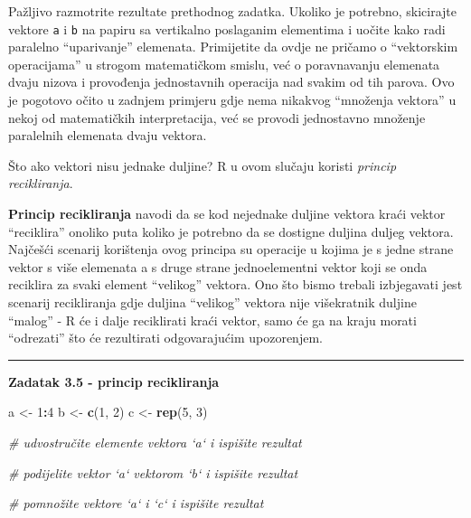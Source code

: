 \documentclass[]{book}
\newenvironment{Shaded}{\begin{snugshade}}{\end{snugshade}}
\newcommand{\KeywordTok}[1]{\textcolor[rgb]{0.13,0.29,0.53}{\textbf{#1}}}
\newcommand{\DecValTok}[1]{\textcolor[rgb]{0.00,0.00,0.81}{#1}}
\newcommand{\StringTok}[1]{\textcolor[rgb]{0.31,0.60,0.02}{#1}}
\newcommand{\CommentTok}[1]{\textcolor[rgb]{0.56,0.35,0.01}{\textit{#1}}}
\newcommand{\OperatorTok}[1]{\textcolor[rgb]{0.81,0.36,0.00}{\textbf{#1}}}
\newcommand{\NormalTok}[1]{#1}
\theoremstyle{definition}
\theoremstyle{definition}
\theoremstyle{definition}
\theoremstyle{remark}
\begin{document}
Pažljivo razmotrite rezultate prethodnog zadatka. Ukoliko je potrebno,
skicirajte vektore \texttt{a} i \texttt{b} na papiru sa vertikalno
poslaganim elementima i uočite kako radi paralelno ``uparivanje''
elemenata. Primijetite da ovdje ne pričamo o ``vektorskim operacijama''
u strogom matematičkom smislu, već o poravnavanju elemenata dvaju nizova
i provođenja jednostavnih operacija nad svakim od tih parova. Ovo je
pogotovo očito u zadnjem primjeru gdje nema nikakvog ``množenja
vektora'' u nekoj od matematičkih interpretacija, već se provodi
jednostavno množenje paralelnih elemenata dvaju vektora.

Što ako vektori nisu jednake duljine? R u ovom slučaju koristi
\emph{princip recikliranja}.

\textbf{Princip recikliranja} navodi da se kod nejednake duljine vektora
kraći vektor ``reciklira'' onoliko puta koliko je potrebno da se
dostigne duljina duljeg vektora. Najčešći scenarij korištenja ovog
principa su operacije u kojima je s jedne strane vektor s više elemenata
a s druge strane jednoelementni vektor koji se onda reciklira za svaki
element ``velikog'' vektora. Ono što bismo trebali izbjegavati jest
scenarij recikliranja gdje duljina ``velikog'' vektora nije višekratnik
duljine ``malog'' - R će i dalje reciklirati kraći vektor, samo će ga na
kraju morati ``odrezati'' što će rezultirati odgovarajućim upozorenjem.

\begin{center}\rule{0.5\linewidth}{\linethickness}\end{center}

\textbf{Zadatak 3.5 - princip recikliranja}

\begin{Shaded}
\begin{Highlighting}[]
\NormalTok{a <-}\StringTok{ }\DecValTok{1}\OperatorTok{:}\DecValTok{4}
\NormalTok{b <-}\StringTok{ }\KeywordTok{c}\NormalTok{(}\DecValTok{1}\NormalTok{, }\DecValTok{2}\NormalTok{)}
\NormalTok{c <-}\StringTok{ }\KeywordTok{rep}\NormalTok{(}\DecValTok{5}\NormalTok{, }\DecValTok{3}\NormalTok{)}

\CommentTok{# udvostručite elemente vektora `a` i ispišite rezultat}

\CommentTok{# podijelite vektor `a` vektorom `b` i ispišite rezultat}

\CommentTok{# pomnožite vektore `a` i `c` i ispišite rezultat}
\end{Highlighting}
\end{Shaded}
\end{document}
